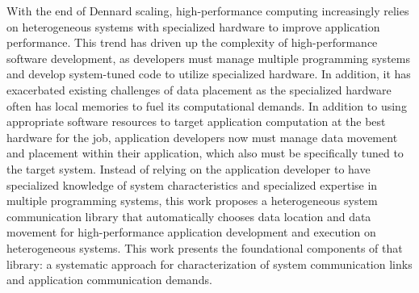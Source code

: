 With the end of Dennard scaling, high-performance computing increasingly relies on heterogeneous systems with specialized hardware to improve application performance.
This trend has driven up the complexity of high-performance software development, as developers must manage multiple programming systems and develop system-tuned code to utilize specialized hardware.
In addition, it has exacerbated existing challenges of data placement as the specialized hardware often has local memories to fuel its computational demands.
In addition to using appropriate software resources to target application computation at the best hardware for the job, application developers now must manage data movement and placement within their application, which also must be specifically tuned to the target system.
Instead of relying on the application developer to have specialized knowledge of system characteristics and specialized expertise in multiple programming systems, this work proposes a heterogeneous system communication library that automatically chooses data location and data movement for high-performance application development and execution on heterogeneous systems.
This work presents the foundational components of that library: a systematic approach for characterization of system communication links and application communication demands.